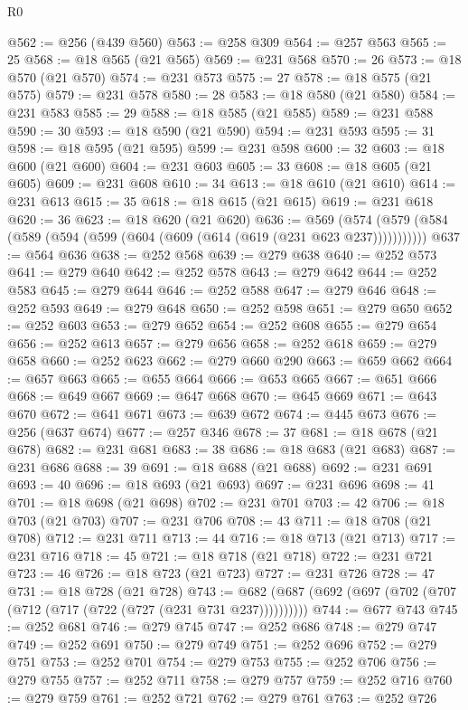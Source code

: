 \begin{lexlean}{R0}
\begin{coremodule}
@562 := @256 (@439 @560)
@563 := @258 @309
@564 := @257 @563
@565 := 25
@568 := @18 @565 (@21 @565)
@569 := @231 @568
@570 := 26
@573 := @18 @570 (@21 @570)
@574 := @231 @573
@575 := 27
@578 := @18 @575 (@21 @575)
@579 := @231 @578
@580 := 28
@583 := @18 @580 (@21 @580)
@584 := @231 @583
@585 := 29
@588 := @18 @585 (@21 @585)
@589 := @231 @588
@590 := 30
@593 := @18 @590 (@21 @590)
@594 := @231 @593
@595 := 31
@598 := @18 @595 (@21 @595)
@599 := @231 @598
@600 := 32
@603 := @18 @600 (@21 @600)
@604 := @231 @603
@605 := 33
@608 := @18 @605 (@21 @605)
@609 := @231 @608
@610 := 34
@613 := @18 @610 (@21 @610)
@614 := @231 @613
@615 := 35
@618 := @18 @615 (@21 @615)
@619 := @231 @618
@620 := 36
@623 := @18 @620 (@21 @620)
@636 := @569 (@574 (@579 (@584 (@589 (@594 (@599 (@604 (@609 (@614 (@619 (@231 @623 @237)))))))))))
@637 := @564 @636
@638 := @252 @568
@639 := @279 @638
@640 := @252 @573
@641 := @279 @640
@642 := @252 @578
@643 := @279 @642
@644 := @252 @583
@645 := @279 @644
@646 := @252 @588
@647 := @279 @646
@648 := @252 @593
@649 := @279 @648
@650 := @252 @598
@651 := @279 @650
@652 := @252 @603
@653 := @279 @652
@654 := @252 @608
@655 := @279 @654
@656 := @252 @613
@657 := @279 @656
@658 := @252 @618
@659 := @279 @658
@660 := @252 @623
@662 := @279 @660 @290
@663 := @659 @662
@664 := @657 @663
@665 := @655 @664
@666 := @653 @665
@667 := @651 @666
@668 := @649 @667
@669 := @647 @668
@670 := @645 @669
@671 := @643 @670
@672 := @641 @671
@673 := @639 @672
@674 := @445 @673
@676 := @256 (@637 @674)
@677 := @257 @346
@678 := 37
@681 := @18 @678 (@21 @678)
@682 := @231 @681
@683 := 38
@686 := @18 @683 (@21 @683)
@687 := @231 @686
@688 := 39
@691 := @18 @688 (@21 @688)
@692 := @231 @691
@693 := 40
@696 := @18 @693 (@21 @693)
@697 := @231 @696
@698 := 41
@701 := @18 @698 (@21 @698)
@702 := @231 @701
@703 := 42
@706 := @18 @703 (@21 @703)
@707 := @231 @706
@708 := 43
@711 := @18 @708 (@21 @708)
@712 := @231 @711
@713 := 44
@716 := @18 @713 (@21 @713)
@717 := @231 @716
@718 := 45
@721 := @18 @718 (@21 @718)
@722 := @231 @721
@723 := 46
@726 := @18 @723 (@21 @723)
@727 := @231 @726
@728 := 47
@731 := @18 @728 (@21 @728)
@743 := @682 (@687 (@692 (@697 (@702 (@707 (@712 (@717 (@722 (@727 (@231 @731 @237))))))))))
@744 := @677 @743
@745 := @252 @681
@746 := @279 @745
@747 := @252 @686
@748 := @279 @747
@749 := @252 @691
@750 := @279 @749
@751 := @252 @696
@752 := @279 @751
@753 := @252 @701
@754 := @279 @753
@755 := @252 @706
@756 := @279 @755
@757 := @252 @711
@758 := @279 @757
@759 := @252 @716
@760 := @279 @759
@761 := @252 @721
@762 := @279 @761
@763 := @252 @726

\end{coremodule}
\end{lexlean}
